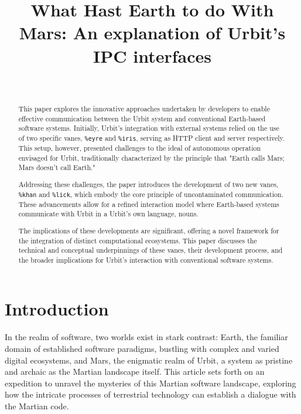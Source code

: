 \documentclass[twoside]{article}
\title{What Hast Earth to do With Mars: An explanation of Urbit's IPC interfaces}
\author{~\authorpatp \\ \affiliation}
\date{}
\begin{document}
\maketitle
\thispagestyle{firststyle}

\begin{abstract}
  This paper explores the innovative approaches undertaken by developers to enable effective communication between the Urbit system and conventional Earth-based software systems. Initially, Urbit's integration with external systems relied on the use of two specific vanes, \texttt{\%eyre} and \texttt{\%iris}, serving as HTTP client and server respectively. This setup, however, presented challenges to the ideal of autonomous operation envisaged for Urbit, traditionally characterized by the principle that "Earth calls Mars; Mars doesn't call Earth."

  Addressing these challenges, the paper introduces the development of two new vanes, \texttt{\%khan} and \texttt{\%lick}, which embody the core principle of uncontaminated communication. These advancements allow for a refined interaction model where Earth-based systems communicate with Urbit in a Urbit's own language, nouns.

The implications of these developments are significant, offering a novel framework for the integration of distinct computational ecosystems. This paper discusses the technical and conceptual underpinnings of these vanes, their development process, and the broader implications for Urbit's interaction with conventional software systems.

\end{abstract}

\setcounter{page}{1}

\tableofcontents

\section{Introduction}
In the realm of software, two worlds exist in stark contrast: 
Earth, the familiar domain of established software paradigms, bustling with complex and varied digital ecosystems, 
and Mars, the enigmatic realm of Urbit, a system as pristine and archaic as the Martian landscape itself. 
This article sets forth on an expedition to unravel the mysteries of this Martian software landscape, 
exploring how the intricate processes of terrestrial technology can establish a dialogue with the Martian code.
\end{document}
